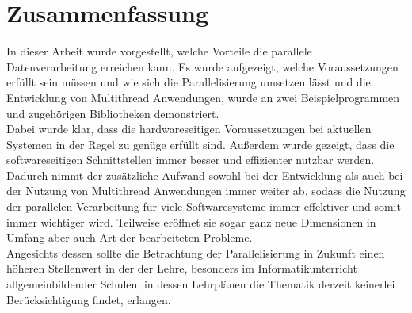 \chapter{Zusammenfassung}
In dieser Arbeit wurde vorgestellt, welche Vorteile die parallele Datenverarbeitung erreichen kann. Es wurde aufgezeigt, welche Voraussetzungen erfüllt sein müssen und wie sich die Parallelisierung umsetzen lässt und die Entwicklung von Multithread Anwendungen, wurde an zwei Beispielprogrammen und zugehörigen Bibliotheken demonstriert.\\
Dabei wurde klar, dass die hardwareseitigen Voraussetzungen bei aktuellen Systemen in der Regel zu genüge erfüllt sind. Außerdem wurde gezeigt, dass die softwareseitigen Schnittstellen immer besser und effizienter nutzbar werden. Dadurch nimmt der zusätzliche Aufwand sowohl bei der Entwicklung als auch bei der Nutzung von Multithread Anwendungen immer weiter ab, sodass die Nutzung der parallelen Verarbeitung für viele Softwaresysteme immer effektiver und somit immer wichtiger wird. Teilweise eröffnet sie sogar ganz neue Dimensionen in Umfang aber auch Art der bearbeiteten Probleme.\\
Angesichts dessen sollte die Betrachtung der Parallelisierung in Zukunft einen höheren Stellenwert in der der Lehre, besonders im Informatikunterricht allgemeinbildender Schulen, in dessen Lehrplänen die Thematik derzeit keinerlei Berücksichtigung findet, erlangen. \cite{lehrplan_informatik}